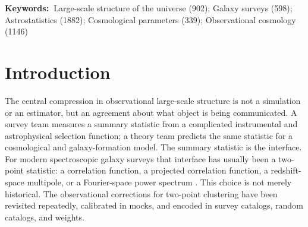 \documentclass[apj]{emulateapj}
\providecommand{\keywords}[1]{\par\noindent\textbf{Keywords:\ }#1\par}
\begin{document}
\begin{abstract}
uncertainty of the completion --- to be added in quadrature to a
cosmic-variance or simulation covariance, not used in place of it --- and it is
deliberately not designed to bracket cosmic truth at the nominal rate.  We
demonstrate this calibration at the per-object redshift level and in the
ensemble-mean recovery of two-point and higher-order (nearest-neighbor,
counts-in-cells) statistics.  We also describe a complementary field-level route:
a kernel (FKP) estimate of the galaxy density field, built with a covariance
tabulated from the measured correlation function and sampled as a
coverage-scaled ensemble on a sparse neighbor graph, evaluated along each
missing galaxy's line of sight.  The resulting catalogs are intended to let
analysts run two-point, higher-order, marked, nearest-neighbor, topological,
field-level, or simulation-based statistics directly on completed catalogs while
propagating the observational-completion uncertainty by resampling the catalog
posterior.
\end{abstract}

\keywords{Large-scale structure of the universe (902); Galaxy surveys (598);
Astrostatistics (1882); Cosmological parameters (339); Observational cosmology
(1146)}

\maketitle

\section{Introduction}
\label{sec:intro}

The central compression in observational large-scale structure is not a
simulation or an estimator, but an agreement about what object is being
communicated.  A survey team measures a summary statistic from a complicated
instrumental and astrophysical selection function; a theory team predicts the
same statistic for a cosmological and galaxy-formation model.  The summary
statistic is the interface.  For modern spectroscopic galaxy surveys that
interface has usually been a two-point statistic: a correlation function, a
projected correlation function, a redshift-space multipole, or a Fourier-space
power spectrum \citep{DavisPeebles1983,LandySzalay1993,Hamilton1993,FKP1994}.
This choice is not merely historical.  The observational corrections for
two-point clustering have been revisited repeatedly, calibrated in mocks, and
encoded in survey catalogs, random catalogs, and weights.
\end{document}
